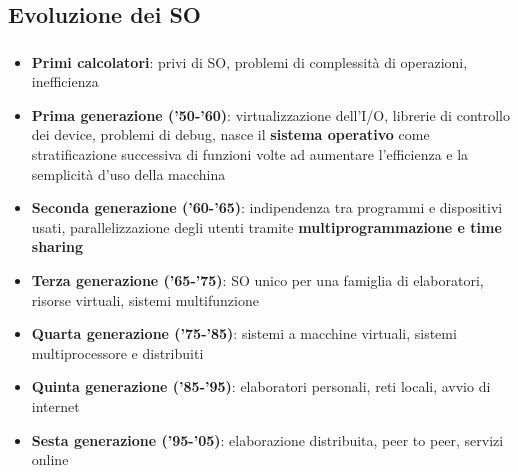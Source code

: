 \documentclass{beamer}
\newenvironment{mainframe}{
	\begin{frame}
		\frametitle{\insertsubsection}
		\framesubtitle{\insertsection}
	}{
	\end{frame}
}
\begin{document}
\subsection{Evoluzione dei SO}
\begin{mainframe}
	\begin{itemize}
		\item \textbf{Primi calcolatori}: privi di SO, problemi di complessità di operazioni, inefficienza
		\item \textbf{Prima generazione ('50-'60)}: virtualizzazione dell'I/O, librerie di controllo dei device, problemi di debug, nasce il \textbf{sistema operativo} come stratificazione successiva di funzioni volte ad aumentare l'efficienza e la semplicità d'uso della macchina
		\item \textbf{Seconda generazione ('60-'65)}: indipendenza tra programmi e dispositivi usati, parallelizzazione degli utenti tramite \textbf{multiprogrammazione e time sharing}
		\item \textbf{Terza generazione ('65-'75)}: SO unico per una famiglia di elaboratori, risorse virtuali, sistemi multifunzione
	\end{itemize}
\end{mainframe}
\begin{frame}
	\begin{itemize}
			\item \textbf{Quarta generazione ('75-'85)}: sistemi a macchine virtuali, sistemi multiprocessore e distribuiti
	\item \textbf{Quinta generazione ('85-'95)}: elaboratori personali, reti locali, avvio di internet
	\item \textbf{Sesta generazione ('95-'05)}: elaborazione distribuita, peer to peer, servizi online
	\end{itemize}
\end{frame}
\end{document}
